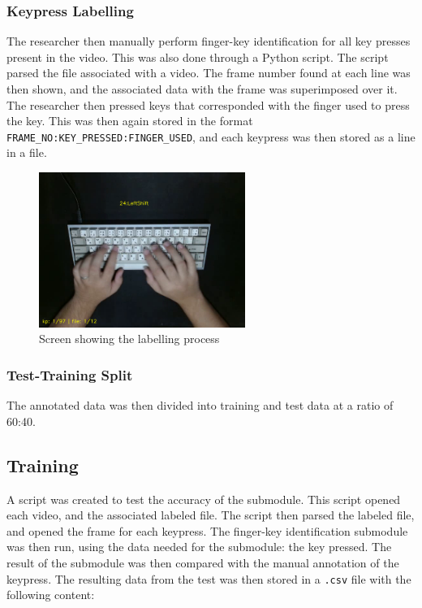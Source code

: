 \documentclass{report}
\begin{document}
\subsubsection{Keypress Labelling}
The researcher then manually perform finger-key identification for all key
presses present in the video. This was also done through a Python script. The
script parsed the file associated with a video. The frame number found at each
line was then shown, and the associated data with the frame was superimposed
over it. The researcher then pressed keys that corresponded with the finger used
to press the key. This was then again stored in the format
\texttt{FRAME\_NO:KEY\_PRESSED:FINGER\_USED}, and each keypress was then stored
as a line in a file.

\begin{figure}[H]
	\centering
	\includegraphics[width=0.6\textwidth]{labelling.png}
	\caption{Screen showing the labelling process}
	\centering
\end{figure}


\subsubsection{Test-Training Split}
The annotated data was then divided into training and test data at a ratio of
60:40.

\subsection{Training}
A script was created to test the accuracy of the submodule. This script opened
each video, and the associated labeled file. The script then parsed the labeled
file, and opened the frame for each keypress. The finger-key identification
submodule was then run, using the data needed for the submodule: the key
pressed. The result of the submodule was then compared with the manual
annotation of the keypress. The resulting data from the test was then stored in
a \texttt{.csv} file with the following content:
\end{document}
